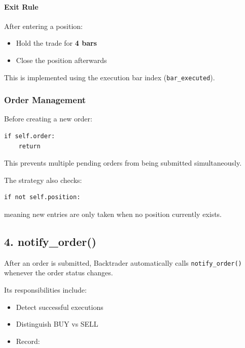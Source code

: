 \documentclass[12pt,openany]{book}
\begin{document}
\paragraph{Exit Rule}

After entering a position:

\begin{itemize}[leftmargin=*]
    \item Hold the trade for \textbf{4 bars}
    \item Close the position afterwards
\end{itemize}

This is implemented using the execution bar index (\texttt{bar\_executed}).

\subsubsection{Order Management}

Before creating a new order:

\begin{Verbatim}[breaklines=true,breakanywhere=true,fontsize=\small]
if self.order:
    return
\end{Verbatim}

This prevents multiple pending orders from being submitted simultaneously.

The strategy also checks:

\begin{Verbatim}[breaklines=true,breakanywhere=true,fontsize=\small]
if not self.position:
\end{Verbatim}

meaning new entries are only taken when no position currently exists.

\subsection{4. notify\_order()}

After an order is submitted, Backtrader automatically calls \texttt{notify\_order()} whenever the order status changes.

Its responsibilities include:

\begin{itemize}[leftmargin=*]
    \item Detect successful executions
    \item Distinguish BUY vs SELL
    \item Record:
\end{itemize}
\end{document}
